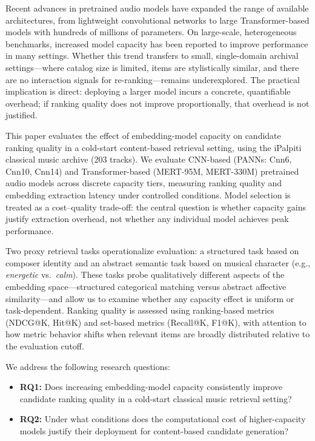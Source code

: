\documentclass[sigconf]{acmart}
\begin{document}
Recent advances in pretrained audio models have expanded the range of available architectures, from lightweight convolutional networks to large Transformer-based models with hundreds of millions of parameters. On large-scale, heterogeneous benchmarks, increased model capacity has been reported to improve performance in many settings. Whether this trend transfers to small, single-domain archival settings---where catalog size is limited, items are stylistically similar, and there are no interaction signals for re-ranking---remains underexplored. The practical implication is direct: deploying a larger model incurs a concrete, quantifiable overhead; if ranking quality does not improve proportionally, that overhead is not justified.

This paper evaluates the effect of embedding-model capacity on candidate ranking quality in a cold-start content-based retrieval setting, using the iPalpiti classical music archive (203 tracks). We evaluate CNN-based (PANNs: Cnn6, Cnn10, Cnn14) and Transformer-based (MERT-95M, MERT-330M) pretrained audio models across discrete capacity tiers, measuring ranking quality and embedding extraction latency under controlled conditions. Model selection is treated as a cost--quality trade-off: the central question is whether capacity gains justify extraction overhead, not whether any individual model achieves peak performance.

Two proxy retrieval tasks operationalize evaluation: a structured task based on composer identity and an abstract semantic task based on musical character (e.g., \emph{energetic} vs.\ \emph{calm}). These tasks probe qualitatively different aspects of the embedding space---structured categorical matching versus abstract affective similarity---and allow us to examine whether any capacity effect is uniform or task-dependent. Ranking quality is assessed using ranking-based metrics (NDCG@K, Hit@K) and set-based metrics (Recall@K, F1@K), with attention to how metric behavior shifts when relevant items are broadly distributed relative to the evaluation cutoff.

We address the following research questions:

\begin{itemize}
  \item \textbf{RQ1:} Does increasing embedding-model capacity consistently improve candidate ranking quality in a cold-start classical music retrieval setting?
  \item \textbf{RQ2:} Under what conditions does the computational cost of higher-capacity models justify their deployment for content-based candidate generation?
\end{itemize}
\end{document}
